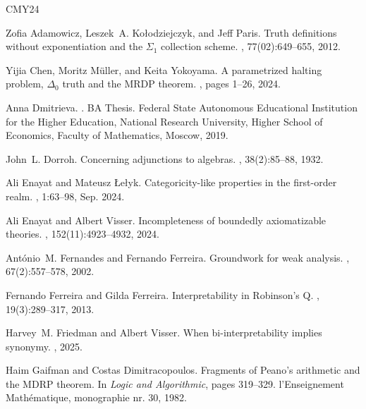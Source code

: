 \documentclass{amsart}
\begin{document}
\begin{thebibliography}{CMY24}

Zofia Adamowicz, Leszek~A. Ko{\l}odziejczyk, and Jeff Paris.
\newblock Truth definitions without exponentiation and the {{$\Sigma_1$}}
  collection scheme.
, 77(02):649--655, 2012.

Yijia Chen, Moritz M{\"u}ller, and Keita Yokoyama.
\newblock A parametrized halting problem, {$\Delta _0$} truth and the {MRDP}
  theorem.
,
  pages 1--26, 2024.

Anna Dmitrieva.
.
\newblock BA Thesis. Federal State Autonomous Educational Institution for the
  Higher Education, National Research University, Higher School of Economics,
  Faculty of Mathematics, Moscow, 2019.

John~L. Dorroh.
\newblock Concerning adjunctions to algebras.
, 38(2):85--88,
  1932.

Ali Enayat and Mateusz \L{}e\l{}yk.
\newblock Categoricity-like properties in the first-order realm.
, 1:63–98, Sep.
  2024.

Ali Enayat and Albert Visser.
\newblock Incompleteness of boundedly axiomatizable theories.
, 152(11):4923--4932, 2024.

Ant{\'o}nio~{M.} Fernandes and Fernando Ferreira.
\newblock Groundwork for weak analysis.
, 67(2):557--578, 2002.

Fernando Ferreira and Gilda Ferreira.
\newblock Interpretability in {R}obinson's {{\textsf Q}}.
, 19(3):289--317, 2013.

Harvey~M. Friedman and Albert Visser.
\newblock When bi-interpretability implies synonymy.
, 2025.

Haim Gaifman and Costas Dimitracopoulos.
\newblock Fragments of {P}eano's arithmetic and the {M}{D}{R}{P} theorem.
\newblock In {\em Logic and Algorithmic}, pages 319--329. l'Enseignement
  Math\'ematique, monographie nr. 30, 1982.


\end{thebibliography}
\end{document}

